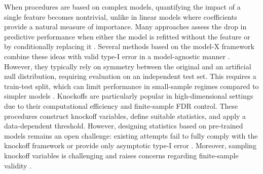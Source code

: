 \documentclass{article}
\theoremstyle{plain}
\theoremstyle{definition}
\theoremstyle{remark}
\begin{document}


When procedures are based on complex models, quantifying the impact of a single feature becomes nontrivial, unlike in linear models where coefficients provide a natural measure of importance. Many approaches assess the drop in predictive performance when either the model is refitted without the feature \cite{lei2018, williamson2021} or by conditionally replacing it \cite{Strobl2008, chamma2024statistically}. Several methods based on the model-X framework \cite{candes2018panning} combine these ideas with valid type-I error in a model-agnostic manner \cite{Tansey02012022}. However, they typically rely on symmetry between the original and an artificial null distribution, requiring evaluation on an independent test set. This requires a train-test split, which can limit performance in small-sample regimes compared to simpler models \cite{liu2022fast}. Knockoffs are particularly popular in high-dimensional settings due to their computational efficiency and finite-sample FDR control. These procedures construct knockoff variables, define suitable statistics, and apply a data-dependent threshold. However, designing statistics based on pre-trained models remains an open challenge: existing attempts fail to fully comply with the knockoff framework or provide only asymptotic type-I error \cite{Watson2021}. Moreover, sampling knockoff variables is challenging and raises concerns regarding finite-sample validity \cite{blain2025knockoffsfaildiagnosingfixing}.
\end{document}
